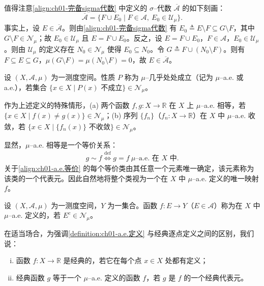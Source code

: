 \documentclass[../../main.tex]{subfiles}%
\begin{document}
\begin{remark}\label{remark:ch01-完备化刻画}
值得注意\eqref{align:ch01-完备sigma代数} 中定义的 $\sigma$--代数 $\overline{\mathcal{A}}$ 的如下刻画：
\[
\overline{\mathcal{A}}=\{F\cup E_0\mid F\in\mathcal{A},\ E_0\in\mathcal{U}_\mu\}.
\]
事实上，设 $E\in\overline{\mathcal{A}}$。则由\eqref{align:ch01-完备sigma代数} 有 $E_0\triangleq E\setminus F\subseteq G\setminus F$，其中 $G\setminus F\in\mathcal{N}_\mu$；故 $E_0\in\mathcal{U}_\mu$ 且 $E=F\cup E_0$。反之，设 $E=F\cup E_0$，$F\in\mathcal{A}$，$E_0\in\mathcal{U}_\mu$。则由 $\mathcal{U}_\mu$ 的定义存在 $N_0\in\mathcal{N}_\mu$ 使得 $E_0\subseteq N_0$。令 $G\triangleq F\cup(N_0\setminus F)$。则有 $F\subseteq E\subseteq G$，$\mu(G\setminus F)=\mu(N_0\setminus F)=0$，故 $E\in\overline{\mathcal{A}}$。
\end{remark}

\begin{definition}\label{definition:ch01-a.e.}
设 $(X,\mathcal{A},\mu)$ 为一测度空间。性质 $P$ 称为 $\mu$--几乎处处成立（记为 $\mu$--a.e. 或 a.e.），若集合 $\{x\in X\mid P(x)\text{ 不成立}\}\in\mathcal{N}_\mu$。
\end{definition}

作为上述定义的特殊情形，(a) 两个函数 $f,g:X\to\mathbb{R}$ 在 $X$ 上 $\mu$--a.e. 相等，若 $\{x\in X\mid f(x)\neq g(x)\}\in\mathcal{N}_\mu$；(b) 序列 $\{f_n\}$（$f_n:X\to\mathbb{R}$）在 $X$ 中 $\mu$--a.e. 收敛，若 $\{x\in X\mid\{f_n(x)\}\text{ 不收敛}\}\in\mathcal{N}_\mu$。

显然，$\mu$--a.e. 相等是一个等价关系：
\begin{align}
g\sim f \overset{\mathrm{def}}{\Longleftrightarrow} g=f\ \mu\text{--a.e. 在 }X\text{ 中}. \label{align:ch01-a.e.等价}
\end{align}
关于\eqref{align:ch01-a.e.等价} 的每个等价类由其任意一个元素唯一确定，该元素称为该类的一个代表元。因此自然地将整个类视为一个在 $X$ 中 $\mu$--a.e. 定义的唯一映射 $f$。

\begin{definition}\label{definition:ch01-a.e.定义}
设 $(X,\mathcal{A},\mu)$ 为一测度空间，$Y$ 为一集合。函数 $f:E\to Y$（$E\in\mathcal{A}$）称为在 $X$ 中 $\mu$--a.e. 定义的，若 $E^c\in\mathcal{N}_\mu$。
\end{definition}

在适当场合，为强调\cref{definition:ch01-a.e.定义} 与经典逐点定义之间的区别，我们说：
\begin{enumerate}[(i)]
\item 函数 $f:X\to\mathbb{R}$ 是经典的，若它在每个点 $x\in X$ 处都有定义；
\item 经典函数 $g$ 等于一个 $\mu$--a.e. 定义的函数 $f$，若 $g$ 是 $f$ 的一个经典代表元。
\end{enumerate}
\end{document}
